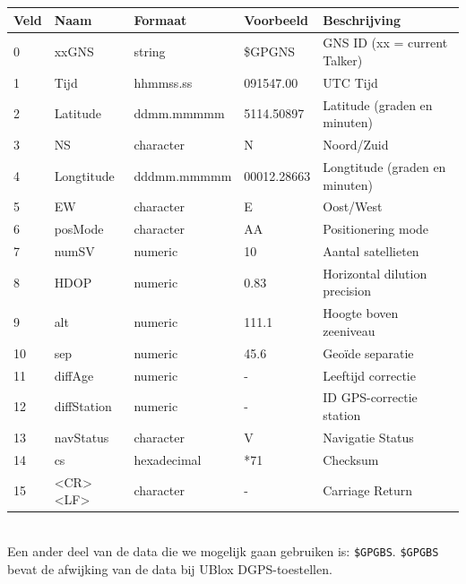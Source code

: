 \begin{tabularx}{\textwidth}{| l | l | l | l | X |}
    \hline
    \textbf{Veld} & \textbf{Naam} & \textbf{Formaat} & \textbf{Voorbeeld} & \textbf{Beschrijving}          \\ \hline
    0             & xxGNS         & string           & \$GPGNS            & GNS ID (xx = current Talker)   \\ \hline
    1             & Tijd          & hhmmss.ss        & 091547.00          & UTC Tijd                       \\ \hline
    2             & Latitude      & ddmm.mmmmm       & 5114.50897         & Latitude (graden en minuten)   \\ \hline
    3             & NS            & character        & N                  & Noord/Zuid                     \\ \hline
    4             & Longtitude    & dddmm.mmmmm      & 00012.28663        & Longtitude (graden en minuten) \\ \hline
    5             & EW            & character        & E                  & Oost/West                      \\ \hline
    6             & posMode       & character        & AA                 & Positionering mode             \\ \hline
    7             & numSV         & numeric          & 10                 & Aantal satellieten             \\ \hline
    8             & HDOP          & numeric          & 0.83               & Horizontal dilution precision  \\ \hline
    9             & alt           & numeric          & 111.1              & Hoogte boven zeeniveau         \\ \hline
    10            & sep           & numeric          & 45.6               & Geoïde separatie               \\ \hline
    11            & diffAge       & numeric          & -                  & Leeftijd correctie             \\ \hline
    12            & diffStation   & numeric          & -                  & ID GPS-correctie station       \\ \hline
    13            & navStatus     & character        & V                  & Navigatie Status               \\ \hline
    14            & cs            & hexadecimal      & *71                & Checksum                       \\ \hline
    15            & <CR><LF>      & character        & -                  & Carriage Return                \\ \hline
\end{tabularx}
\citep[p. 116]{UBlox8}\\
Een ander deel van de data die we mogelijk gaan gebruiken is:
\texttt{\$GPGBS}. \texttt{\$GPGBS} bevat de afwijking van de data bij UBlox
DGPS-toestellen.
\citep[p. 111]{UBlox8}

